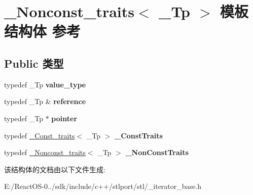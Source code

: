 \hypertarget{struct___nonconst__traits}{}\section{\+\_\+\+Nonconst\+\_\+traits$<$ \+\_\+\+Tp $>$ 模板结构体 参考}
\label{struct___nonconst__traits}
\subsection*{Public 类型}
\begin{DoxyCompactItemize}
\item 
\mbox{\label{struct___nonconst__traits_a1866467fc94e1a6aa21c1d0a6468cb28}} 
typedef \+\_\+\+Tp {\bfseries value\+\_\+type}
\item 
\mbox{\label{struct___nonconst__traits_acaf1305f066fb71f0e4af284f41f6967}} 
typedef \+\_\+\+Tp \& {\bfseries reference}
\item 
\mbox{\label{struct___nonconst__traits_a1561a0f2b33c135165e9d2910aa326cb}} 
typedef \+\_\+\+Tp $\ast$ {\bfseries pointer}
\item 
\mbox{\label{struct___nonconst__traits_aa1a59d13d1bb440c6eec55a0d8b96888}} 
typedef \hyperlink{struct___const__traits}{\+\_\+\+Const\+\_\+traits}$<$ \+\_\+\+Tp $>$ {\bfseries \+\_\+\+Const\+Traits}
\item 
\mbox{\label{struct___nonconst__traits_a0ba43a2b79af3c749e27e6a280bda9e9}} 
typedef \hyperlink{struct___nonconst__traits}{\+\_\+\+Nonconst\+\_\+traits}$<$ \+\_\+\+Tp $>$ {\bfseries \+\_\+\+Non\+Const\+Traits}
\end{DoxyCompactItemize}


该结构体的文档由以下文件生成\+:\begin{DoxyCompactItemize}
\item 
E\+:/\+React\+O\+S-\/0../sdk/include/c++/stlport/stl/\+\_\+iterator\+\_\+base.\+h\end{DoxyCompactItemize}
